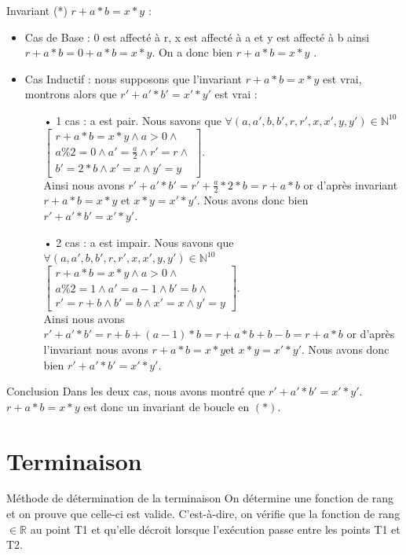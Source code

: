 \documentclass[12pt,a4paper]{report}
\begin{document}
\begin{flushleft}
Invariant (*) $r+a*b = x*y$ :
\begin{itemize}
\item Cas de Base : 0   est affecté à r, x  est affecté à a  et y   est affecté à b  ainsi $ r +a*b = 0 + a*b = x*y $. On a donc bien $ r + a*b = x*y$ .
\item Cas Inductif : nous supposons que l'invariant  $ r + a*b = x*y$ est vrai, montrons alors que  $ r' + a'*b' = x'*y'$ est vrai :
\begin{itemize}
\item[•]  1 cas : a est pair.  Nous savons que $\forall(a,a',b,b',r,r',x,x',y,y')\in \mathbb{N}^{10}$ $\left[ \begin{array}{c} r + a*b = x*y\wedge a>0\wedge \\
a\%2=0\wedge a'= \frac{a}{2} \wedge r'=r \wedge\\
b'=2*b\wedge x'=x \wedge y'=y\end{array}
\right]$. \\ Ainsi nous avons $ r' + a'*b' = r' + \frac{a}{2} * 2 * b  = r+ a*b$ or d’après
 invariant $ r+a*b = x*y $ et  $ x*y = x'*y'$. Nous avons donc bien $ r'+a'*b' = x'*y'$.
\item[•] 2 cas : a est impair. Nous savons que $\forall(a,a',b,b',r,r',x,x',y,y')\in \mathbb{N}^{10}$ $\left[ \begin{array}{c} r + a*b = x*y\wedge a>0\wedge \\
a\%2=1\wedge a'= a-1\wedge b'=b \wedge\\
r'=r+b\wedge b'=b\wedge x'=x \wedge y'=y\end{array}
\right]$. \\ Ainsi nous avons $r'+ a'*b'=r+b+(a-1)*b = r+a*b + b-b = r+a*b  $ or d’après l'invariant nous avons  $ r+a*b = x*y $et $ x*y = x'*y' $. Nous avons donc bien $ r'+a'*b' = x'*y'$.
\end{itemize}
\end{itemize}
\begin{Cas1}{Conclusion}
 Dans les deux cas, nous avons montré que $ r'+a'*b'= x'*y' $.
$ r+a*b=x*y $ est donc un invariant de boucle en $(*) $.
\end{Cas1}
\end{flushleft}

\section{Terminaison}
\begin{mybox}{Méthode de détermination de la terminaison}
On détermine une fonction de rang et on prouve que celle-ci est valide. C'est-à-dire, on vérifie que la fonction de rang $\in\mathbb{R}$ au point T1 et qu'elle décroit lorsque l'exécution passe entre les points T1 et T2.
\end{mybox}
\end{document}
